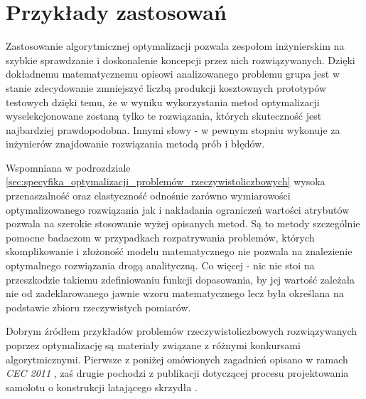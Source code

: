 \section{Przykłady zastosowań}
\par
Zastosowanie algorytmicznej optymalizacji pozwala zespołom inżynierskim na szybkie sprawdzanie i doskonalenie koncepcji przez nich rozwiązywanych. Dzięki dokładnemu matematycznemu opisowi analizowanego problemu grupa jest w stanie zdecydowanie zmniejszyć liczbą produkcji kosztownych prototypów testowych dzięki temu, że w wyniku wykorzystania metod optymalizacji wyselekcjonowane zostaną tylko te rozwiązania, których skuteczność jest najbardziej prawdopodobna. Innymi słowy - w pewnym stopniu wykonuje za inżynierów znajdowanie rozwiązania metodą prób i błędów. 
\par
Wspomniana w podrozdziale \ref{sec:specyfika_optymalizacji_problemów_rzeczywistoliczbowych} wysoka przenaszalność oraz elastyczność odnośnie zarówno wymiarowości optymalizowanego rozwiązania jak i nakładania ograniczeń wartości atrybutów pozwala na szerokie stosowanie wyżej opisanych metod. Są to metody szczególnie pomocne badaczom w przypadkach rozpatrywania problemów, których skomplikowanie i złożoność modelu matematycznego nie pozwala na znalezienie optymalnego rozwiązania drogą analityczną. Co więcej - nic nie stoi na przeszkodzie takiemu zdefiniowaniu funkcji dopasowania, by jej wartość zależała nie od zadeklarowanego jawnie wzoru matematycznego lecz była określana na podstawie zbioru rzeczywistych pomiarów. 
\par
Dobrym źródłem przykładów problemów rzeczywistoliczbowych rozwiązywanych poprzez optymalizację są materiały związane z różnymi konkursami algorytmicznymi. Pierwsze z poniżej omówionych zagadnień opisano w ramach \emph{CEC 2011} \cite{cec2011}, zaś drugie pochodzi z publikacji dotyczącej procesu projektowania samolotu o konstrukcji latającego skrzydła \cite{lee2007multi}.
